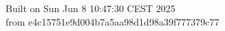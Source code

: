 {\noindent Built on Sun Jun  8 10:47:30 CEST 2025} \\ 
 {\noindent from e4c15751e9d004b7a5aa98d1d98a39f777379c77}
